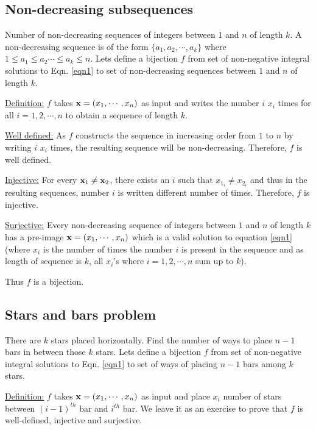 \subsection{Non-decreasing subsequences}\label{non-dec-subseq-prob} Number of non-decreasing sequences of integers between $1$ and $n$ of length $k$. A non-decreasing sequence is of the form $\{a_1,a_2,\cdots,a_k\}$ where $1\leq a_1\leq a_2\cdots\leq a_k\leq n$. Lets define a bijection $f$ from set of non-negative integral solutions to Eqn. \ref{eqn1} to set of non-decreasing sequences between $1$ and $n$ of length $k$. 
\begin{description}
\item\underline{Definition:} $f$ takes $\mathbf{x}=(x_1,\cdots,x_n)$ as input and writes the number $i$ $x_i$ times for all $i=1,2,\cdots,n$ to obtain a sequence of length $k$.
\item\underline{Well defined:} As $f$ constructs the sequence in increasing order from $1$ to $n$ by writing $i$ $x_i$ times, the resulting sequence will be non-decreasing. Therefore, $f$ is well defined.
\item\underline{Injective:} For every $\mathbf{x}_1\neq\mathbf{x}_2$, there exists an $i$ such that $x_{1_i} \neq x_{2_i}$ and thus in the resulting sequences, number $i$ is written different number of times. Therefore, $f$ is injective.
\item\underline{Surjective:} Every non-decreasing sequence of integers between $1$ and $n$ of length $k$ has a pre-image $\mathbf{x}=(x_1,\cdots,x_n)$  which is a valid solution to equation \ref{eqn1} (where $x_i$ is the number of times the number $i$ is present in the sequence and as length of sequence is $k$, all $x_i$'s where $i=1,2,\cdots,n$ sum up to $k$).
\end{description}
Thus $f$ is a bijection.
\subsection{Stars and bars problem}\label{star-bar-prob} There are $k$ stars placed horizontally. Find the number of ways to place $n-1$ bars in between those $k$ stars. Lets define a bijection $f$ from set of non-negative integral solutions to Eqn. \ref{eqn1} to set of ways of placing $n-1$ bars among $k$ stars.
\begin{description}
\item\underline{Definition:} $f$ takes $\mathbf{x}=(x_1,\cdots,x_n)$ as input and place $x_i$ number of stars between $(i-1)^{th}$ bar and $i^{th}$ bar. We leave it as an exercise to prove that $f$ is well-defined, injective and surjective.
\end{description}

